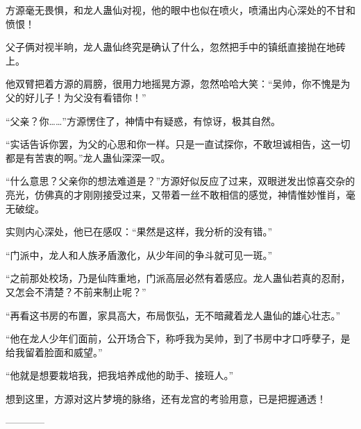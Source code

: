 \begin{this_body}
方源毫无畏惧，和龙人蛊仙对视，他的眼中也似在喷火，喷涌出内心深处的不甘和愤恨！

父子俩对视半晌，龙人蛊仙终究是确认了什么，忽然把手中的镇纸直接抛在地砖上。

他双臂把着方源的肩膀，很用力地摇晃方源，忽然哈哈大笑：“吴帅，你不愧是为父的好儿子！为父没有看错你！”

“父亲？你……”方源愣住了，神情中有疑惑，有惊讶，极其自然。

“实话告诉你罢，为父的心思和你一样。只是一直试探你，不敢坦诚相告，这一切都是有苦衷的啊。”龙人蛊仙深深一叹。

“什么意思？父亲你的想法难道是？”方源好似反应了过来，双眼迸发出惊喜交杂的亮光，仿佛真的才刚刚接受过来，又带着一丝不敢相信的感觉，神情惟妙惟肖，毫无破绽。

实则内心深处，他已在感叹：“果然是这样，我分析的没有错。”

“门派中，龙人和人族矛盾激化，从少年间的争斗就可见一斑。”

“之前那处校场，乃是仙阵重地，门派高层必然有着感应。龙人蛊仙若真的忍耐，又怎会不清楚？不前来制止呢？”

“再看这书房的布置，家具高大，布局恢弘，无不暗藏着龙人蛊仙的雄心壮志。”

“他在龙人少年们面前，公开场合下，称呼我为吴帅，到了书房中才口呼孽子，是给我留着脸面和威望。”

“他就是想要栽培我，把我培养成他的助手、接班人。”

想到这里，方源对这片梦境的脉络，还有龙宫的考验用意，已是把握通透！

------------

\end{this_body}

